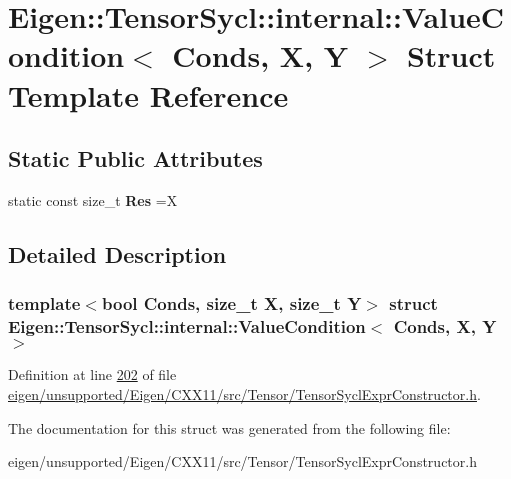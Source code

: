 \hypertarget{struct_eigen_1_1_tensor_sycl_1_1internal_1_1_value_condition}{}\section{Eigen\+:\+:Tensor\+Sycl\+:\+:internal\+:\+:Value\+Condition$<$ Conds, X, Y $>$ Struct Template Reference}
\label{struct_eigen_1_1_tensor_sycl_1_1internal_1_1_value_condition}
\subsection*{Static Public Attributes}
\begin{DoxyCompactItemize}
\item 
\mbox{\label{struct_eigen_1_1_tensor_sycl_1_1internal_1_1_value_condition_adbad36215697a6e56c66d494489dfb9f}} 
static const size\+\_\+t {\bfseries Res} =X
\end{DoxyCompactItemize}


\subsection{Detailed Description}
\subsubsection*{template$<$bool Conds, size\+\_\+t X, size\+\_\+t Y$>$\newline
struct Eigen\+::\+Tensor\+Sycl\+::internal\+::\+Value\+Condition$<$ Conds, X, Y $>$}



Definition at line \hyperlink{eigen_2unsupported_2_eigen_2_c_x_x11_2src_2_tensor_2_tensor_sycl_expr_constructor_8h_source_l00202}{202} of file \hyperlink{eigen_2unsupported_2_eigen_2_c_x_x11_2src_2_tensor_2_tensor_sycl_expr_constructor_8h_source}{eigen/unsupported/\+Eigen/\+C\+X\+X11/src/\+Tensor/\+Tensor\+Sycl\+Expr\+Constructor.\+h}.



The documentation for this struct was generated from the following file\+:\begin{DoxyCompactItemize}
\item 
eigen/unsupported/\+Eigen/\+C\+X\+X11/src/\+Tensor/\+Tensor\+Sycl\+Expr\+Constructor.\+h\end{DoxyCompactItemize}
